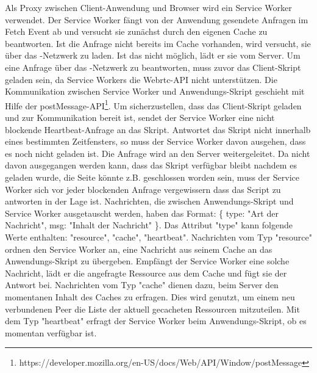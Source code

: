 \begin{description}
Als Proxy zwischen Client-Anwendung und Browser wird ein Service Worker verwendet. Der Service Worker fängt von der Anwendung gesendete Anfragen im Fetch Event ab und versucht sie zunächst durch den eigenen Cache zu beantworten. Ist die Anfrage nicht bereits im Cache vorhanden, wird versucht, sie über das \pTp-Netzwerk zu laden. Ist das nicht möglich, lädt er sie vom Server. 
Um eine Anfrage über das \pTp-Netzwerk zu beantworten, muss zuvor das Client-Skript geladen sein, da Service Workers die Webrtc-API nicht unterstützen. Die Kommunikation zwischen Service Worker und Anwendungs-Skript geschieht mit Hilfe der postMessage-API\footnote{https://developer.mozilla.org/en-US/docs/Web/API/Window/postMessage}. Um sicherzustellen, dass das Client-Skript geladen und zur Kommunikation bereit ist, sendet der Service Worker eine nicht blockende Heartbeat-Anfrage an das Skript. Antwortet das Skript nicht innerhalb eines bestimmten Zeitfensters, so muss der Service Worker davon ausgehen, dass es noch nicht geladen ist. Die Anfrage wird an den Server weitergeleitet. Da nicht davon ausgegangen werden kann, dass das Skript verfügbar bleibt nachdem es geladen wurde, die Seite könnte z.B. geschlossen worden sein, muss der Service Worker sich vor jeder blockenden Anfrage vergewissern dass das Script zu antworten in der Lage ist. Nachrichten, die zwischen Anwendungs-Skript und Service Worker ausgetauscht werden, haben das Format: \{ type: "Art der Nachricht", msg: "Inhalt der Nachricht" \}. Das Attribut "type" kann folgende Werte enthalten: "resource", "cache", "heartbeat". Nachrichten vom Typ "resource" ordnen den Service Worker an, eine Nachricht aus seinem Cache an das Anwendungs-Skript zu übergeben. Empfängt der Service Worker eine solche Nachricht, lädt er die angefragte Ressource aus dem Cache und fügt sie der Antwort bei. Nachrichten vom Typ "cache" dienen dazu, beim Server den momentanen Inhalt des Caches zu erfragen. Dies wird genutzt, um einem neu verbundenen Peer die Liste der aktuell gecacheten Ressourcen mitzuteilen. Mit dem Typ "heartbeat" erfragt der Service Worker beim Anwendungs-Skript, ob es momentan verfügbar ist.   

\end{description}
